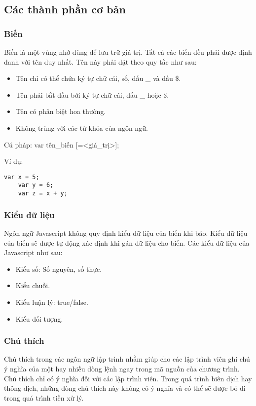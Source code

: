 \subsection{Các thành phần cơ bản}
\subsubsection{Biến}
Biến là một vùng nhớ dùng để lưu trữ giá trị. Tất cả các biến đều phải được định danh với tên duy nhất. Tên này phải đặt theo quy tắc như sau:
\begin{itemize}

\item 	Tên chỉ có thể chứa ký tự chữ cái, số, dấu \_ và dấu \$.
\item 	Tên phải bắt đầu bởi ký tự chữ cái, dấu \_ hoặc \$.
\item 	Tên có phân biệt hoa thường.
\item 	Không trùng với các từ khóa của ngôn ngữ.
\end{itemize}

Cú pháp:  { \ttfamily
	var  tên\_biến [=<giá\_trị>]; 
	}

Ví dụ:
\lstset{language=XML}
\begin{lstlisting}[escapechar=`]
	var x = 5;
	var y = 6;
	var z = x + y;
\end{lstlisting}
\subsubsection{ Kiểu dữ liệu}
Ngôn ngữ Javascript không quy định kiểu dữ liệu của biến khi báo. Kiểu dữ liệu của biến sẽ được tự động xác định khi gán dữ liệu cho biến. Các kiểu dữ liệu của Javascript như sau:
\begin{itemize}

\item	Kiểu số: Số nguyên, số thực.
\item	Kiểu chuỗi.
\item	Kiểu luận lý: true/false.
\item	Kiểu đối tượng.

\end{itemize}
\subsubsection{Chú thích}
Chú thích trong các ngôn ngữ lập trình nhằm giúp cho các lập trình viên ghi chú ý nghĩa của một hay nhiều dòng lệnh ngay trong mã nguồn của chương trình. Chú thích chỉ có ý nghĩa đối với các lập trình viên. Trong quá trình biên dịch hay thông dịch, những dòng chú thích này không có ý nghĩa và có thể sẽ được bỏ đi trong quá trình tiền xử lý. 


